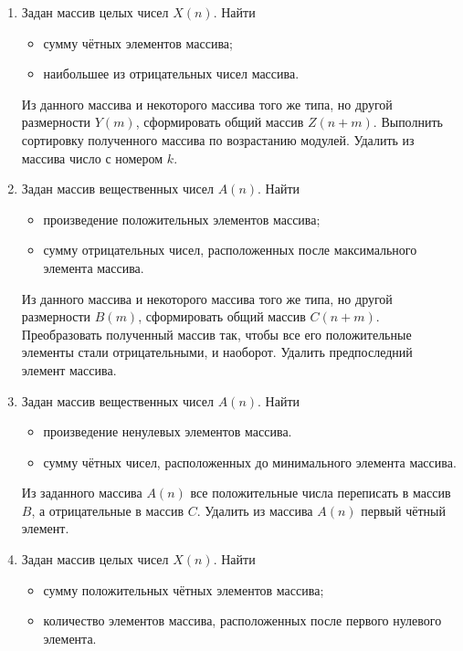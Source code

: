 \begin{enumerate}
\item Задан массив целых чисел $X(n)$. Найти
\begin{itemize}
\item сумму чётных элементов массива;
\item наибольшее из отрицательных чисел массива.
\end{itemize}

Из данного массива и некоторого массива того же типа, но другой размерности $Y(m)$,
сформировать общий массив $Z(n+m)$. Выполнить сортировку полученного массива по
возрастанию модулей. Удалить из массива число с номером $k$.
\item Задан массив вещественных чисел $A(n)$. Найти 
\begin{itemize}
\item произведение положительных элементов массива;
\item сумму отрицательных чисел, расположенных после максимального элемента массива.
\end{itemize}

Из данного массива и некоторого массива того же типа, но другой размерности $B(m)$,
сформировать общий массив $C(n+m)$. Преобразовать полученный массив так, чтобы все
его положительные элементы стали отрицательными, и наоборот. Удалить предпоследний элемент массива.
\item Задан массив вещественных чисел $A(n)$. Найти
\begin{itemize}
\item произведение ненулевых элементов массива.
\item сумму чётных чисел, расположенных до минимального элемента массива.
\end{itemize}

Из заданного массива $A(n)$ все положительные числа переписать в массив $B$, а
отрицательные в массив $C$. Удалить из массива $A(n)$ первый чётный элемент.

\item Задан массив целых чисел $X(n)$. Найти
\begin{itemize}
\item сумму положительных чётных элементов массива;
\item количество элементов массива, расположенных после первого нулевого элемента.
\end{itemize}


\end{enumerate}
